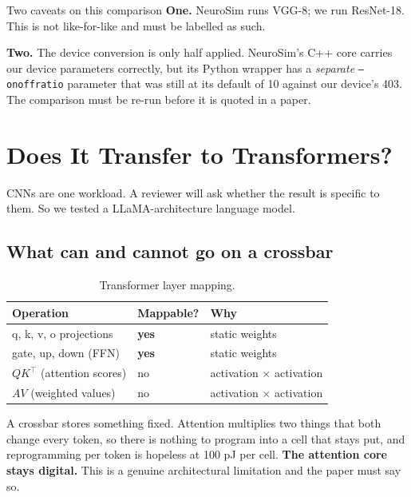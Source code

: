 \documentclass[11pt,a4paper]{report}
\begin{document}
\begin{warnbox}{Two caveats on this comparison}
\textbf{One.} NeuroSim runs VGG-8; we run ResNet-18. This is not like-for-like
and must be labelled as such.

\textbf{Two.} The device conversion is only half applied. NeuroSim's C++ core
carries our device parameters correctly, but its Python wrapper has a
\emph{separate} \texttt{--onoffratio} parameter that was still at its default
of 10 against our device's 403. The comparison must be re-run before it is
quoted in a paper.
\end{warnbox}

\chapter{Does It Transfer to Transformers?}
\label{ch:transformers}

CNNs are one workload. A reviewer will ask whether the result is specific to
them. So we tested a LLaMA-architecture language model.

\section{What can and cannot go on a crossbar}

\begin{table}[h]
\centering
\caption{Transformer layer mapping.}
\begin{tabular}{lll}
\toprule
Operation & Mappable? & Why \\
\midrule
q, k, v, o projections & \textbf{yes} & static weights \\
gate, up, down (FFN) & \textbf{yes} & static weights \\
$Q K^{\!\top}$ (attention scores) & no & activation $\times$ activation \\
$A V$ (weighted values) & no & activation $\times$ activation \\
\bottomrule
\end{tabular}
\end{table}

A crossbar stores something fixed. Attention multiplies two things that both
change every token, so there is nothing to program into a cell that stays put,
and reprogramming per token is hopeless at 100 pJ per cell. \textbf{The
attention core stays digital.} This is a genuine architectural limitation and
the paper must say so.
\end{document}

